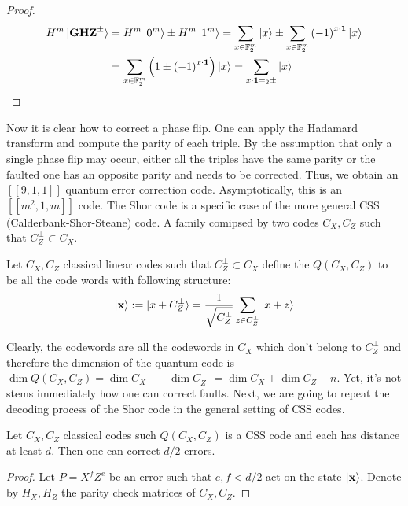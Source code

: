 \begin{proof}

  \begin{equation*}
    \begin{split}
      H^{m}\ket{\mathbf{GHZ}^{\pm}} & = H^{m}\ket{0^{m}} \pm  H^{m}\ket{1^{m}} = \sum_{x \in \mathbb{F}_{2}^{m}}{\ket{x}} \pm  \sum_{x \in \mathbb{F}_{2}^{m}}{\left( -1 \right)^{x \cdot \mathbf{1}} \ket{x}} \\ & = \sum_{x \in \mathbb{F}_{2}^{m}}{ \left( 1 \pm \left( -1 \right)^{x \cdot \mathbf{1}}  \right) \ket{x} } =  \sum_{x \cdot \mathbf{1} =_2 \pm }{\ket{x} }
    \end{split}
  \end{equation*}
\end{proof}

Now it is clear how to correct a phase flip. One can apply the Hadamard transform and compute the parity of each triple. By the assumption that only a single phase flip may occur, either all the triples have the same parity or the faulted one has an opposite parity and needs to be corrected. Thus, we obtain an $\left[ \left[ 9,1,1 \right] \right]$ quantum error correction code. Asymptotically, this is an $\left[ \left[ m^{2}, 1, m \right] \right]$ code. The Shor code is a specific case of the more general CSS (Calderbank-Shor-Steane) code. A family comipsed by two codes $C_{X}, C_{Z}$ such that $C_{Z}^{\perp} \subset C_{X}$. 
\begin{definition}
  Let $C_{X}, C_{Z}$ classical linear codes such that $C_{Z}^{\perp} \subset C_{X}$ define the $Q\left( C_{X},C_{Z} \right)$ to be all the code words with following structure:
  \begin{equation*}
    \begin{split}
    \ket { \mathbf{ x } } := \ket { x + C_{Z}^{\perp} } = \frac{1}{\sqrt{C_{Z}^{\perp}}} \sum_{z \in C_{Z}^{\perp}}{ \ket{ x + z }} 
    \end{split}
  \end{equation*}
\end{definition}
Clearly, the codewords are all the codewords in $C_{X}$ which don't belong to $C_{Z}^{\perp}$ and therefore the dimension of the quantum code is $\dim Q\left( C_{X}, C_{Z} \right) = \dim C_{X} + - \dim C_{Z^{\perp}} = \dim C_{X} + \dim C_{Z} - n$. Yet, it's not stems immediately how one can correct faults. Next, we are going to repeat the decoding process of the Shor code in the general setting of CSS codes.  
\begin{lemma}
  Let $C_{X},C_{Z}$ classical codes such $Q\left( C_{X},C_{Z} \right)$ is a CSS code and each has distance at least $d$. Then one can correct $d/2$ errors.       
\end{lemma}
\begin{proof}
  Let $P = X^{f}Z^{e}$ be an error such that $e, f < d/2$ act on the state $\ket{\mathbf{x}}$. Denote by $H_{X}, H_{Z}$ the parity check matrices of $C_{X},C_{Z}$.  
\end{proof}

